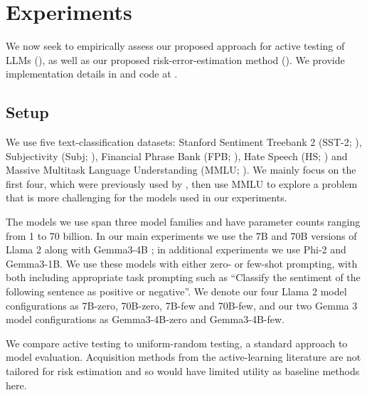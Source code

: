 \section{Experiments}\label{sec:experiments}

We now seek to empirically assess our proposed approach for active testing of LLMs (), as well as our proposed risk-error-estimation method ().
We provide implementation details in  and code at .


\subsection{Setup}\label{sec:experimental_setup}

We use five text-classification datasets: Stanford Sentiment Treebank 2 (SST-2; \citealp{socher2013recursive}), Subjectivity (Subj; \citealp{pang2004sentimental}), Financial Phrase Bank (FPB; \citealp{malo2013good}), Hate Speech (HS; \citealp{degibert2018hate}) and Massive Multitask Language Understanding (MMLU; \citealp{hendrycks2021measuring}).
We mainly focus on the first four, which were previously used by \citet{kossen2024context}, then use MMLU to explore a problem that is more challenging for the models used in our experiments.

The models we use span three model families and have parameter counts ranging from 1 to 70 billion.
In our main experiments we use the 7B and 70B versions of Llama 2 \citep{touvron2023llama} along with Gemma3-4B \citep{kamath2025gemma}; in additional experiments we use Phi-2 \citep{javaheripi2023phi} and Gemma3-1B.
We use these models with either zero- or few-shot prompting, with both including appropriate task prompting such as ``Classify the sentiment of the following sentence as positive or negative''.
We denote our four Llama 2 model configurations as 7B-zero, 70B-zero, 7B-few and 70B-few, and our two Gemma 3 model configurations as Gemma3-4B-zero and Gemma3-4B-few.




We compare active testing to uniform-random testing, a standard approach to model evaluation.
Acquisition methods from the active-learning literature \citep{settles2012active} are not tailored for risk estimation \citep{kossen2021active} and so would have limited utility as baseline methods here.


